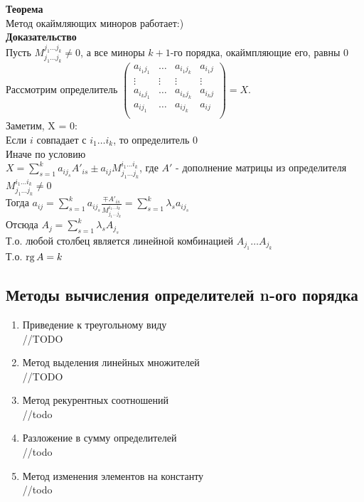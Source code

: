 \documentclass[12pt]{article}
\begin{document}
\textbf{Теорема}\\
Метод окаймляющих миноров работает:)\\
\textbf{Доказательство}\\
Пусть $M_{j_1\ldots j_k}^{j_1\ldots j_k} \neq 0$, а все миноры $k+1$-го порядка, окаймпляющие его, равны 0\\
Рассмотрим определитель $\begin{pmatrix}
    a_{i_1j_1} & \ldots & a_{i_1j_k} & a_{i_1j}\\
    \vdots & \vdots & \vdots & \vdots\\
    a_{i_kj_1} & \ldots & a_{i_kj_k} & a_{i_kj}\\
    a_{ij_1} & \ldots & a_{ij_k} & a_{ij}\\
\end{pmatrix} = X$.\\
Заметим, X = 0:\\
Если $i$ совпадает с $i_1 \ldots i_k$, то определитель 0\\
Иначе по условию\\
$X = \sum_{s=1}^k a_{ij_s}A'_{is} \pm a_{ij}M_{j_1\ldots j_k}^{i_1\ldots i_k}$, где $A'$ - дополнение матрицы из определителя\\
$M_{j_1\ldots j_k}^{i_1\ldots i_k} \neq 0$\\
Тогда $a_{ij} = \sum_{s=1}^k a_{ij_s} \frac{\mp A'_{is}}{M_{j_1\ldots j_k}^{i_1\ldots i_k}} = \sum_{s=1}^k \lambda_s a_{ij_s}$\\
Отсюда $A_j = \sum_{s=1}^k\lambda_s A_{j_s}$\\
Т.о. любой столбец является линейной комбинацией $A_{j_1}\ldots A_{j_k}$\\
Т.о. $\operatorname{rg} A = k$
\subsection{Методы вычисления определителей n-ого порядка}
\begin{enumerate}
    \item Приведение к треугольному виду\\
    //TODO
    \item Метод выделения линейных множителей\\
    //TODO
    \item Метод рекурентных соотношений\\
    //todo
    \item Разложение в сумму определителей\\
    //todo
    \item Метод изменения элементов на константу\\
    //todo
\end{enumerate}
\end{document}
